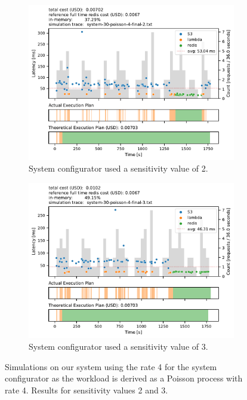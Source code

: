 \begin{figure}[pht!]
    \centering
    \begin{subfigure}{.8\textwidth}
        \includegraphics[width=\linewidth]{figures/system-30-poisson-4-final-2.pdf}
        \caption{System configurator used a sensitivity value of 2.}
        \label{fig:poisson_4_2}
    \end{subfigure}
    \begin{subfigure}{.8\textwidth}
        \includegraphics[width=\linewidth]{figures/system-30-poisson-4-final-3.pdf}
        \caption{System configurator used a sensitivity value of 3.}
        \label{fig:poisson_4_3}
    \end{subfigure}
    \caption{Simulations on our system using the rate 4 for the system configurator as the workload is derived as a Poisson process with rate 4. Results for sensitivity values 2 and 3.}
    \label{fig:poisson_4_23}
\end{figure}


